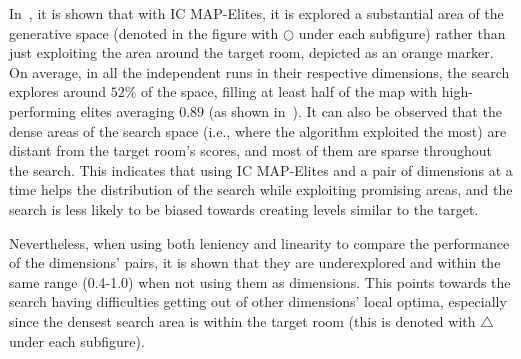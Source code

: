 In~, it is shown that with IC MAP-Elites, it is explored a substantial area of the generative space (denoted in the figure with $\bigcirc$ under each subfigure) rather than just exploiting the area around the target room, depicted as an orange marker. On average, in all the independent runs in their respective dimensions, the search explores around $52$\% of the space, filling at least half of the map with high-performing elites averaging $0.89$ (as shown in~). It can also be observed that the dense areas of the search space (i.e., where the algorithm exploited the most) are distant from the target room's scores, and most of them are sparse throughout the search. This indicates that using IC MAP-Elites and a pair of dimensions at a time helps the distribution of the search while exploiting promising areas, and the search is less likely to be biased towards creating levels similar to the target.

Nevertheless, when using both leniency and linearity to compare the performance of the dimensions' pairs, it is shown that they are underexplored and within the same range (0.4-1.0) when not using them as dimensions. This points towards the search having difficulties getting out of other dimensions' local optima, especially since the densest search area is within the target room (this is denoted with $\bigtriangleup$ under each subfigure).






